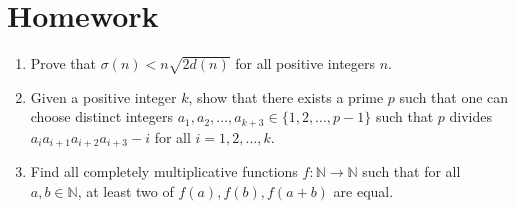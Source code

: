 \documentclass{article}
\begin{document}
\section{Homework}
\begin{enumerate}
	\item Prove that $\sigma(n)<n\sqrt{2d(n)}$ for all positive integers $n$.
	\item Given a positive integer $k$, show that there exists a prime $p$ such
	      that one can choose distinct integers
	      $a_1,a_2,\ldots,a_{k+3}\in\{1,2,\ldots,p-1\}$ such that $p$ divides
	      $a_i a_{i+1}a_{i+2}a_{i+3}-i$ for all $i=1,2,\ldots,k$.
	\item Find all completely multiplicative functions $f:\mathbb N\to\mathbb N$
	      such that for all $a,b\in\mathbb N$, at least two of $f(a),f(b),f(a+b)$ are
	      equal.
\end{enumerate}
\end{document}
